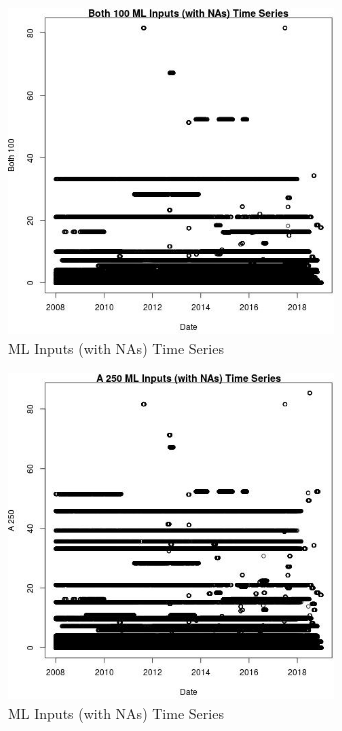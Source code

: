 \begin{figure} 
\centering  
\includegraphics[width=0.77\textwidth]{Code_Outputs/Report_ML_input_PM25_Step4_part_e_de_duplicated_aves_compiled_2019-05-21wNAs_Both_100vDate.jpg} 
\caption{\label{fig:Report_ML_input_PM25_Step4_part_e_de_duplicated_aves_compiled_2019-05-21wNAsBoth_100vDate}ML Inputs (with NAs) Time Series} 
\end{figure} 
 

\begin{figure} 
\centering  
\includegraphics[width=0.77\textwidth]{Code_Outputs/Report_ML_input_PM25_Step4_part_e_de_duplicated_aves_compiled_2019-05-21wNAs_A_250vDate.jpg} 
\caption{\label{fig:Report_ML_input_PM25_Step4_part_e_de_duplicated_aves_compiled_2019-05-21wNAsA_250vDate}ML Inputs (with NAs) Time Series} 
\end{figure} 
 

